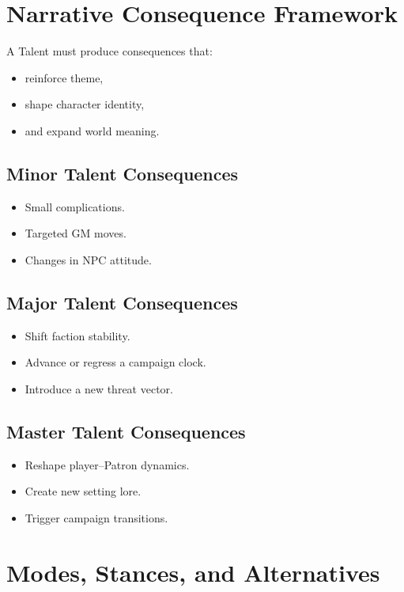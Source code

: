 \documentclass[11pt]{book}
\begin{document}
\section{Narrative Consequence Framework}

A Talent must produce consequences that:
\begin{itemize}
    \item reinforce theme,
    \item shape character identity,
    \item and expand world meaning.
\end{itemize}

\subsection{Minor Talent Consequences}
\begin{itemize}
    \item Small complications.
    \item Targeted GM moves.
    \item Changes in NPC attitude.
\end{itemize}

\subsection{Major Talent Consequences}
\begin{itemize}
    \item Shift faction stability.
    \item Advance or regress a campaign clock.
    \item Introduce a new threat vector.
\end{itemize}

\subsection{Master Talent Consequences}
\begin{itemize}
    \item Reshape player--Patron dynamics.
    \item Create new setting lore.
    \item Trigger campaign transitions.
\end{itemize}

\section{Modes, Stances, and Alternatives}
\end{document}

